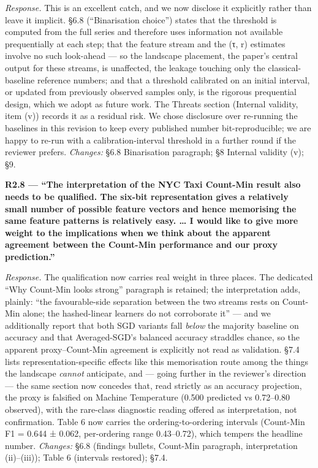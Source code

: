 \documentclass[
  11pt,
]{article}
\begin{document}
\emph{Response.} This is an excellent catch, and we now disclose it
explicitly rather than leave it implicit. §6.8 (``Binarisation choice'')
states that the threshold is computed from the full series and therefore
uses information not available prequentially at each step; that the
feature stream and the (τ, r) estimates involve no such look-ahead ---
so the landscape placement, the paper's central output for these
streams, is unaffected, the leakage touching only the classical-baseline
reference numbers; and that a threshold calibrated on an initial
interval, or updated from previously observed samples only, is the
rigorous prequential design, which we adopt as future work. The Threats
section (Internal validity, item (v)) records it as a residual risk. We
chose disclosure over re-running the baselines in this revision to keep
every published number bit-reproducible; we are happy to re-run with a
calibration-interval threshold in a further round if the reviewer
prefers. \emph{Changes:} §6.8 Binarisation paragraph; §8 Internal
validity (v); §9.

\textbf{R2.8 --- ``The interpretation of the NYC Taxi Count-Min result
also needs to be qualified. The six-bit representation gives a
relatively small number of possible feature vectors and hence memorising
the same feature patterns is relatively easy. \ldots{} I would like to
give more weight to the implications when we think about the apparent
agreement between the Count-Min performance and our proxy prediction.''}

\emph{Response.} The qualification now carries real weight in three
places. The dedicated ``Why Count-Min looks strong'' paragraph is
retained; the interpretation adds, plainly: ``the favourable-side
separation between the two streams rests on Count-Min alone; the
hashed-linear learners do not corroborate it'' --- and we additionally
report that both SGD variants fall \emph{below} the majority baseline on
accuracy and that Averaged-SGD's balanced accuracy straddles chance, so
the apparent proxy--Count-Min agreement is explicitly not read as
validation. §7.4 lists representation-specific effects like this
memorisation route among the things the landscape \emph{cannot}
anticipate, and --- going further in the reviewer's direction --- the
same section now concedes that, read strictly as an accuracy projection,
the proxy is falsified on Machine Temperature (0.500 predicted vs
0.72--0.80 observed), with the rare-class diagnostic reading offered as
interpretation, not confirmation. Table 6 now carries the
ordering-to-ordering intervals (Count-Min F1 = 0.644 ± 0.062,
per-ordering range 0.43--0.72), which tempers the headline number.
\emph{Changes:} §6.8 (findings bullets, Count-Min paragraph,
interpretation (ii)--(iii)); Table 6 (intervals restored); §7.4.
\end{document}
